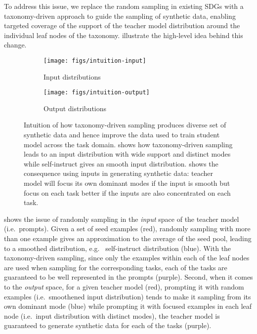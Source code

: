 To address this issue, we replace the random sampling in existing SDGs with a taxonomy-driven approach to guide the sampling of synthetic data, enabling targeted coverage of the support of the teacher model distribution around the individual leaf nodes of the taxonomy.
 illustrate the high-level idea behind this change.
\begin{figure}[h]
\begin{center}
\begin{subfigure}[b]{0.48\textwidth}
    \centering
     \texttt{[image: figs/intuition-input]}
     \caption{Input distributions}\label{fig:intuition-input}
\end{subfigure}
\begin{subfigure}[b]{0.48\textwidth}
    \centering
     \texttt{[image: figs/intuition-output]}
     \caption{Output distributions}\label{fig:intuition-output}
\end{subfigure}
\end{center}
\caption{Intuition of how taxonomy-driven sampling produces diverse set of synthetic data and hence improve the data used to train student model across the task domain.  shows how taxonomy-driven sampling leads to an input distribution with wide support and distinct modes while self-instruct gives an smooth input distribution.  shows the consequence using inputs in generating synthetic data: teacher model will focus its own dominant modes if the input is smooth but focus on each task better if the inputs are also concentrated on each task.}\label{fig:intuition}
\end{figure}
 shows the issue of randomly sampling in the \emph{input} space of the teacher model (i.e.~prompts).
Given a set of seed examples (red), randomly sampling with more than one example gives an approximation to the average of the seed pool, leading to a smoothed distribution, e.g.~ self-instruct distribution (blue).
With the taxonomy-driven sampling, since only the examples within each of the leaf nodes are used when sampling for the corresponding tasks, 
each of the tasks are guaranteed to be well represented in the prompts (purple).
Second, when it comes to the \emph{output} space, for a given teacher model (red), prompting it with random examples (i.e.~smoothened input distribution) tends to make it sampling from its own dominant mode (blue) while prompting it with focused examples in each leaf node (i.e.~input distribution with distinct modes), 
the teacher model is guaranteed to generate synthetic data for each of the tasks (purple).

